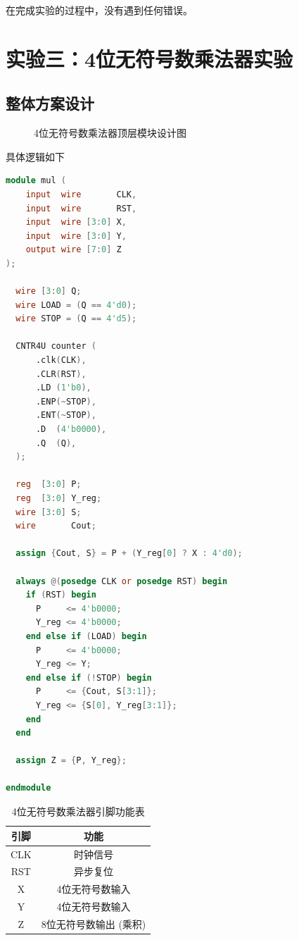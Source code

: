 \documentclass[12pt, a4paper]{ctexart}
\begin{document}
在完成实验的过程中，没有遇到任何错误。

\section{实验三：4位无符号数乘法器实验}

\subsection{整体方案设计}

\begin{figure}[H]
    \centering
    \caption{4位无符号数乘法器顶层模块设计图}
\end{figure}

具体逻辑如下

\begin{lstlisting}[language=Verilog, caption={4位无符号数乘法器顶层模块}]
module mul (
    input  wire       CLK,
    input  wire       RST,
    input  wire [3:0] X,
    input  wire [3:0] Y,
    output wire [7:0] Z
);

  wire [3:0] Q;
  wire LOAD = (Q == 4'd0);
  wire STOP = (Q == 4'd5);

  CNTR4U counter (
      .clk(CLK),
      .CLR(RST),
      .LD (1'b0),
      .ENP(~STOP),
      .ENT(~STOP),
      .D  (4'b0000),
      .Q  (Q),
  );

  reg  [3:0] P;
  reg  [3:0] Y_reg;
  wire [3:0] S;
  wire       Cout;

  assign {Cout, S} = P + (Y_reg[0] ? X : 4'd0);

  always @(posedge CLK or posedge RST) begin
    if (RST) begin
      P     <= 4'b0000;
      Y_reg <= 4'b0000;
    end else if (LOAD) begin
      P     <= 4'b0000;
      Y_reg <= Y;
    end else if (!STOP) begin
      P     <= {Cout, S[3:1]};
      Y_reg <= {S[0], Y_reg[3:1]};
    end
  end

  assign Z = {P, Y_reg};

endmodule
\end{lstlisting}

\begin{table}[H]
    \centering
    \begin{tabular}{|c|c|}
        \hline
        引脚 & 功能 \\
        \hline
        CLK & 时钟信号 \\
        RST & 异步复位 \\
        X   & 4位无符号数输入 \\
        Y   & 4位无符号数输入 \\
        Z   & 8位无符号数输出 (乘积) \\
        \hline
    \end{tabular}
    \caption{4位无符号数乘法器引脚功能表}
\end{table}
\end{document}
